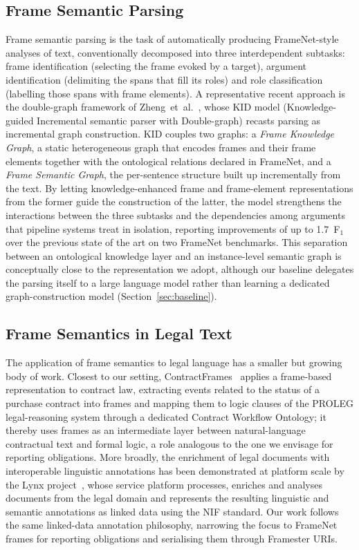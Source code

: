 \documentclass[10pt, a4paper, twocolumn]{article}
\begin{document}
\subsection{Frame Semantic Parsing}

Frame semantic parsing is the task of automatically producing FrameNet-style
analyses of text, conventionally decomposed into three interdependent
subtasks: frame identification (selecting the frame evoked by a target),
argument identification (delimiting the spans that fill its roles) and role
classification (labelling those spans with frame elements). A representative
recent approach is the double-graph framework of
Zheng~et~al.~\cite{zheng-etal-2022-double}, whose KID model (Knowledge-guided
Incremental semantic parser with Double-graph) recasts parsing as incremental
graph construction. KID couples two graphs: a \textit{Frame Knowledge Graph},
a static heterogeneous graph that encodes frames and their frame elements
together with the ontological relations declared in FrameNet, and a
\textit{Frame Semantic Graph}, the per-sentence structure built up
incrementally from the text. By letting knowledge-enhanced frame and
frame-element representations from the former guide the construction of the
latter, the model strengthens the interactions between the three subtasks and
the dependencies among arguments that pipeline systems treat in isolation,
reporting improvements of up to 1.7~F$_1$ over the previous state of the art
on two FrameNet benchmarks. This separation between an ontological knowledge
layer and an instance-level semantic graph is conceptually close to the
representation we adopt, although our baseline delegates the parsing itself to
a large language model rather than learning a dedicated graph-construction
model (Section~\ref{sec:baseline}).

\subsection{Frame Semantics in Legal Text}

The application of frame semantics to legal language has a smaller but growing
body of work. Closest to our setting, ContractFrames~\cite{navas-loro-2019-contractframes}
applies a frame-based representation to contract law, extracting events related
to the status of a purchase contract into frames and mapping them to logic
clauses of the PROLEG legal-reasoning system through a dedicated Contract
Workflow Ontology; it thereby uses frames as an intermediate layer between
natural-language contractual text and formal logic, a role analogous to the one
we envisage for reporting obligations. More broadly, the enrichment of legal
documents with interoperable linguistic annotations has been demonstrated at
platform scale by the Lynx project~\cite{moreno-schneider-2022-lynx}, whose
service platform processes, enriches and analyses documents from the legal
domain and represents the resulting linguistic and semantic annotations as
linked data using the NIF standard. Our work follows the same linked-data
annotation philosophy, narrowing the focus to FrameNet frames for reporting
obligations and serialising them through Framester URIs.
\end{document}
